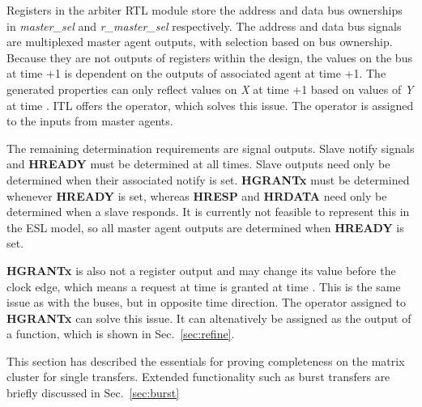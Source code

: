 Registers in the arbiter RTL module store the address and data bus ownerships in \textit{master\_sel} and \textit{r\_master\_sel} respectively. The address and data bus signals are multiplexed master agent outputs, with selection based on bus ownership. Because they are not outputs of registers within the design, the values on the bus at time +1 is dependent on the outputs of associated agent at time +1. The generated properties can only reflect values on \textit{X} at time +1 based on values of \textit{Y} at time . ITL offers the  operator, which solves this issue. The  operator is assigned to the inputs from master agents. \par
The remaining determination requirements are signal outputs. Slave notify signals and \textbf{HREADY} must be determined at all times. Slave outputs need only be determined when their associated notify is set. \textbf{HGRANTx} must be determined whenever \textbf{HREADY} is set, whereas \textbf{HRESP} and \textbf{HRDATA} need only be determined when a slave responds. It is currently not feasible to represent this in the ESL model, so all master agent outputs are determined when \textbf{HREADY} is set. \par
\textbf{HGRANTx} is also not a register output and may change its value before the clock edge, which means a request at time  is granted at time . This is the same issue as with the buses, but in opposite time direction. The  operator assigned to \textbf{HGRANTx} can solve this issue. It can altenatively be assigned as the output of a function, which is shown in Sec.~\ref{sec:refine}. \par 
This section has described the essentials for proving completeness on the matrix cluster for single transfers. Extended functionality such as burst transfers are briefly discussed in Sec.~\ref{sec:burst}
 

